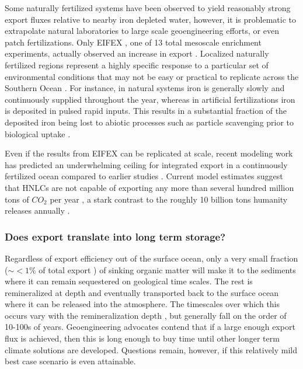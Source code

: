 Some naturally fertilized systems have been observed to yield reasonably strong export fluxes relative to nearby iron depleted water\parencite{BlainEffectnaturaliron2007, PollardSouthernOceandeepwater2009}, however, it is problematic to extrapolate natural laboratories to large scale geoengineering efforts, or even patch fertilizations. Only EIFEX \parencite{SmetacekDeepcarbonexport2012}, one of 13 total mesoscale enrichment experiments, actually observed an increase in export \parencite{YoonOceanIronFertilization2016}. Localized naturally fertilized regions represent a highly specific response to a particular set of environmental conditions that may not be easy or practical to replicate across the Southern Ocean \parencite{SalterDiatomrestingspore2012}. For instance, in natural systems iron is generally slowly and continuously supplied throughout the year, whereas in artificial fertilizations iron is deposited in pulsed rapid inputs. This results in a substantial fraction of the deposited iron being lost to abiotic processes such as particle scavenging prior to biological uptake \parencite{Bowiefateaddediron2001}. 

Even if the results from EIFEX can be replicated at scale, recent modeling work has predicted an underwhelming ceiling for integrated export in a continuously fertilized ocean compared to earlier studies \parencite{AumontGlobalizingresultsocean2006}. Current model estimates suggest that HNLCs are not capable of exporting any more than several hundred million tons of $CO_2$ per year \parencite{BuesselerOceanIronFertilization2008}, a stark contrast to the roughly 10 billion tons humanity releases annually \parencite{HumanNaturalDrivers2007}. 

\subsubsection{Does export translate into long term storage?}

Regardless of export efficiency out of the surface ocean, only a very small fraction ($\sim<1\%$ of total export \parencite{PrenticeIPCCClimateChange2001}) of sinking organic matter will make it to the sediments where it can remain sequestered on geological time scales. The rest is remineralized at depth and eventually transported back to the surface ocean where it can be released into the atmosphere. The timescales over which this occurs vary with the remineralization depth \parencite{GnanadesikanEffectspatchyocean2003}, but generally fall on the order of 10-100s of years. Geoengineering advocates contend that if a large enough export flux is achieved, then this is long enough to buy time until other longer term climate solutions are developed. Questions remain, however, if this relatively mild best case scenario is even attainable.

